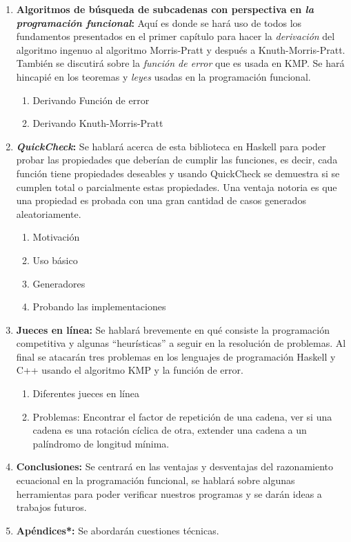 \documentclass[letterpaper,11pt]{article}
\begin{document}
\begin{enumerate}
\item \textbf{Algoritmos de búsqueda de subcadenas con perspectiva en \textit{la programación
funcional}:} Aquí es donde se hará uso de todos los fundamentos presentados en el primer capítulo
para hacer la \textit{derivación} del algoritmo ingenuo al algoritmo Morris-Pratt y después a
Knuth-Morris-Pratt. También se discutirá sobre la \textit{función de error} que es usada en KMP.
Se hará hincapié en los teoremas y \textit{leyes} usadas en la programación funcional.
\begin{enumerate}
    \item Derivando Función de error
    \item Derivando Knuth-Morris-Pratt
\end{enumerate}

\item \textbf{\textit{QuickCheck}:} Se hablará acerca de esta biblioteca en Haskell para poder
probar las propiedades que deberían de cumplir las funciones, es decir, cada función tiene
propiedades deseables y usando QuickCheck se demuestra si se cumplen total o parcialmente
estas propiedades. Una ventaja notoria es que una propiedad es probada con una gran cantidad de
casos generados aleatoriamente.
\begin{enumerate}
    \item Motivación
    \item Uso básico
    \item Generadores
    \item Probando las implementaciones
\end{enumerate}

\item \textbf{Jueces en línea:} Se hablará brevemente en qué consiste la programación competitiva
y algunas ``heurísticas'' a seguir en la resolución de problemas. Al final se atacarán tres
problemas en los lenguajes de programación Haskell y C++ usando el algoritmo KMP y la función
de error.
\begin{enumerate}
    \item Diferentes jueces en línea
    \item Problemas: Encontrar el factor de repetición de una cadena, ver si una cadena es una
    rotación cíclica de otra, extender una cadena a un palíndromo de longitud mínima.
\end{enumerate}

\item \textbf{Conclusiones:} Se centrará en las ventajas y desventajas del razonamiento
ecuacional en la programación funcional, se hablará sobre algunas herramientas para poder
verificar nuestros programas y se darán ideas a trabajos futuros.

\item \textbf{Apéndices*:} Se abordarán cuestiones técnicas.

\end{enumerate}
\end{document}
